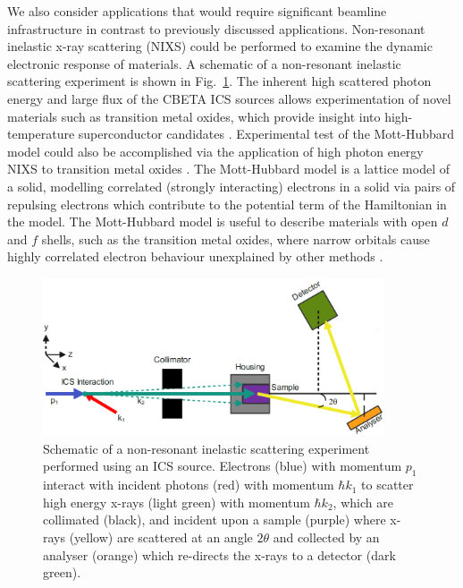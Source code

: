 \documentclass[../main.tex]{subfiles}
\begin{document}
We also consider applications that would require significant beamline infrastructure in contrast to previously discussed applications. Non-resonant inelastic x-ray scattering (NIXS) \cite{isaacs1996inelastic} could be performed to examine the dynamic electronic response of materials. A schematic of a non-resonant inelastic scattering experiment is shown in Fig.~\ref{fig:NIXS_diagram}. The inherent high scattered photon energy and large flux of the CBETA ICS sources allows experimentation of novel materials such as transition metal oxides, which provide insight into high-temperature superconductor candidates \cite{hasan2002momentum,isaacs1996inelastic}. Experimental test of the Mott-Hubbard model \cite{hubbard1963electron,mott1949basis} could also be accomplished via the application of high photon energy NIXS to transition metal oxides \cite{isaacs1996resonant}. The Mott-Hubbard model is a lattice model of a solid, modelling correlated (strongly interacting) electrons in a solid via pairs of repulsing electrons which contribute to the potential term of the Hamiltonian in the model. The Mott-Hubbard model is useful to describe materials with open $d$ and $f$ shells, such as the transition metal oxides, where narrow orbitals cause highly correlated electron behaviour unexplained by other methods \cite{kotliar2004strongly}. 
\begin{figure}[!h]
\centering
\includegraphics[width=0.9\textwidth]{Figures/CBETA_Inverse_Compton_Source_Design/NIXS_diagram_fixed.pdf}
\caption{Schematic of a non-resonant inelastic scattering experiment performed using an ICS source. Electrons (blue) with momentum $p_{1}$ interact with incident photons (red) with momentum $\hbar k_{1}$ to scatter high energy x-rays (light green) with momentum $\hbar k_{2}$, which are collimated (black), and incident upon a sample (purple) where x-rays (yellow) are scattered at an angle $2\theta$ and collected by an analyser (orange) which re-directs the x-rays to a detector (dark green).}
\label{fig:NIXS_diagram}
\end{figure}
\end{document}
